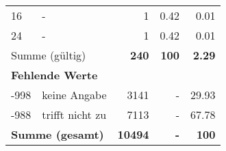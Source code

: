 \begin{longtable}{lXrrr}
     16 &
     \multicolumn{1}{X}{ -  } &


       \num{1} &
       \num[round-mode=places,round-precision=2]{0,42} &
         \num[round-mode=places,round-precision=2]{0,01} \\

     24 &
     \multicolumn{1}{X}{ -  } &


       \num{1} &
       \num[round-mode=places,round-precision=2]{0,42} &
         \num[round-mode=places,round-precision=2]{0,01} \\
     \midrule
     \multicolumn{2}{l}{Summe (gültig)} &
       \textbf{\num{240}} &
     \textbf{100} &
       \textbf{\num[round-mode=places,round-precision=2]{2,29}} \\
     \multicolumn{5}{l}{\textbf{Fehlende Werte}}\\
       -998 &
       keine Angabe &
         \num{3141} &
        - &
         \num[round-mode=places,round-precision=2]{29,93} \\
       -988 &
       trifft nicht zu &
         \num{7113} &
        - &
         \num[round-mode=places,round-precision=2]{67,78} \\
     \midrule
     \multicolumn{2}{l}{\textbf{Summe (gesamt)}} &
          \textbf{\num{10494}} &
        \textbf{-} &
        \textbf{100} \\
     \bottomrule
     \end{longtable}
     

